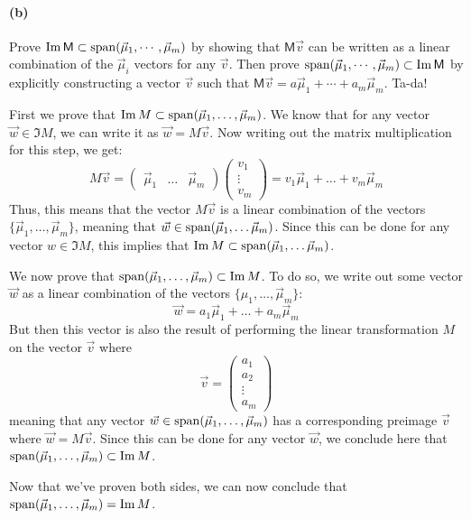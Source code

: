 \documentclass{article}
\begin{document}
\paragraph{(b)}
Prove $\operatorname{Im}\mathsf{M}\subset\operatorname{span}(\vec{\mu}_{1},\cdots, \vec{\mu}_{m})$ by showing that $\mathsf{M}\vec{v}$ can be written as a linear combination of the 
$\vec{\mu}_{i}$ vectors for any $\vec{v}$.  Then prove $\operatorname{span}(\vec{\mu}_{1},\cdots, \vec{\mu}_{m})\subset\operatorname{Im}\mathsf{M}$ by explicitly constructing a vector $\vec{v}$
such that $\mathsf{M}\vec{v} = a\vec{\mu}_{1}+\cdots+a_{m}\vec{\mu}_{m}$.  Ta-da!


\begin{solution}
	First we prove that $\operatorname{Im} M \subset \operatorname{span}(\vec \mu_1, \dots, \vec \mu_m)$. We know that for any vector 
	$\vec w \in \Im M$, we can write it as $\vec w = M\vec v$. Now writing out the matrix multiplication 
	for this step, we get: 
	\[
		M \vec v = \begin{pmatrix} \vec \mu_1 & \dots & \vec \mu_m \end{pmatrix} \begin{pmatrix} v_1\\ \vdots \\ v_m \end{pmatrix}  = v_1\vec \mu_1 + \dots + v_m \vec \mu_m 
	\] 
	Thus, this means that the vector $M\vec v$ is a linear combination of the vectors $\{\vec \mu_1, \dots, 
	\vec \mu_m\}$, meaning that $\vec w \in \operatorname{span}(\vec \mu_1, \dots \vec \mu_m)$. Since this can be done for any vector
	$w \in \Im M$, this implies that $\operatorname{Im} M \subset \operatorname{span}(\vec \mu_1, \dots \vec \mu_m)$. 

	We now prove that $\operatorname{span}(\vec \mu_1, \dots, \vec \mu_m) \subset \operatorname{Im} M$. To do so, we write out some vector 
	$\vec w$ as a linear combination of the vectors $\{\mu_1, \dots , \vec \mu_m\}$:
	\[
	\vec w = a_1\vec \mu_1 + \dots + a_m \vec \mu_m
	\] 
	But then this vector is also the result of performing the linear transformation $M$ on the vector $\vec v$ 
	where 
	\[
	\vec v = \begin{pmatrix}  a_1 \\ a_2 \\ \vdots \\ a_m \end{pmatrix} 
	\] 
	meaning that any vector $\vec w \in \operatorname{span}(\vec \mu_1, \dots, \vec \mu_m)$ has a corresponding preimage $\vec v$
	where $\vec w = M\vec v$. Since this can be done for any vector $\vec w$, we conclude here that $\operatorname{span}(\vec \mu_1, \dots, \vec \mu_m) \subset \operatorname{Im} M$. 

	Now that we've proven both sides, we can now conclude that $\operatorname{span}(\vec \mu_1, \dots, \vec \mu_m) = \operatorname{Im} M$. 
\end{solution}
\end{document}
